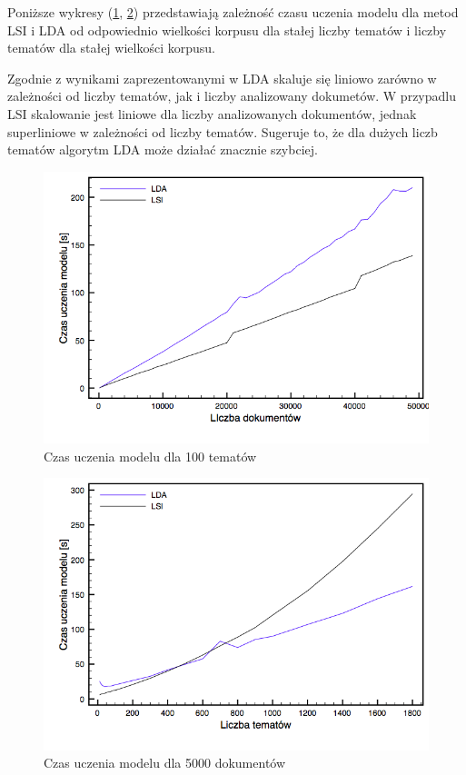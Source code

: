 \documentclass[11pt,a4paper]{article}
\begin{document}
Poniższe wykresy (\ref{time-docs}, \ref{time-topics}) przedstawiają zależność
czasu uczenia modelu dla metod LSI i LDA od odpowiednio wielkości korpusu
dla stałej liczby tematów i liczby tematów dla stałej wielkości korpusu.

Zgodnie z wynikami zaprezentowanymi w \cite{gensim-algorithm} LDA skaluje się
liniowo zarówno w zależności od liczby tematów, jak i liczby analizowany
dokumetów. W przypadlu LSI skalowanie jest liniowe dla liczby analizowanych
dokumentów, jednak superliniowe w zależności od liczby tematów. Sugeruje to, że
dla dużych liczb tematów algorytm LDA może działać znacznie szybciej.

\begin{figure}[h]
\includegraphics[width=\linewidth]{gfx/time_docs.png}
\caption{Czas uczenia modelu dla 100 tematów}
\label{time-docs}
\end{figure}

\begin{figure}[h]
\includegraphics[width=\linewidth]{gfx/time_topics.png}
\caption{Czas uczenia modelu dla 5000 dokumentów}
\label{time-topics}
\end{figure}
\end{document}
